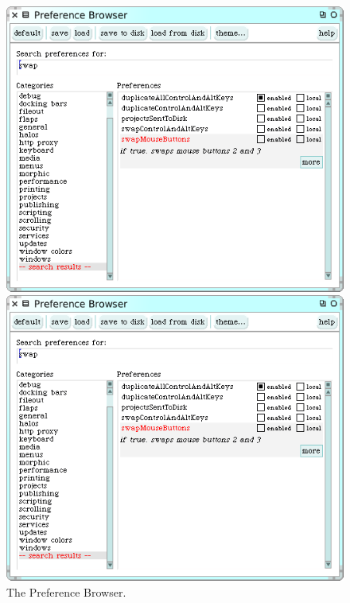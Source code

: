 \documentclass[a4paper,10pt,twoside]{book}
\begin{document}

\begin{figure}[htb]
\ifluluelse
	{\centerline {\includegraphics[width=\textwidth]{PreferenceBrowser}}}
	{\centerline {\includegraphics[scale=0.7]{PreferenceBrowser}}}
\caption{The Preference Browser.\label{fig:prefBrowser}}
\end{figure}

\end{document}
